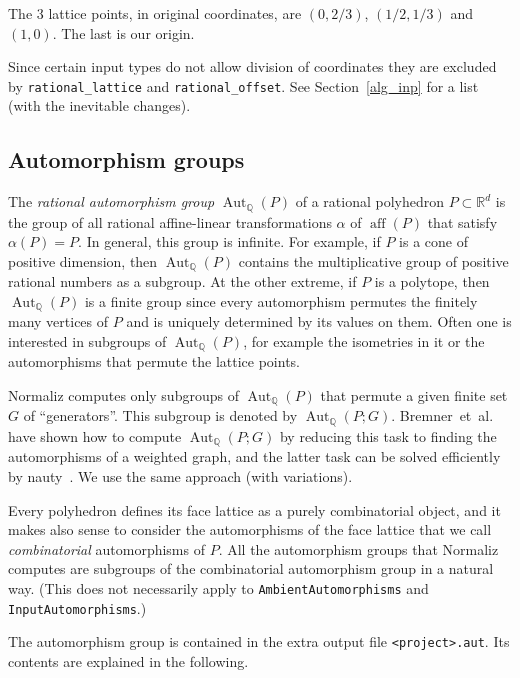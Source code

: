 \documentclass[12pt,a4paper]{scrartcl}
\theoremstyle{definition}
\def\QQ{{\mathbb Q}}
\def\RR{{\mathbb R}}
\DeclareMathOperator{\aff}{aff}
\begin{document}
The $3$ lattice points, in original coordinates, are $(0,2/3)$, $(1/2,1/3) $ and $(1,0)$. The last is our origin.

Since certain input types do not allow division of coordinates they are excluded by \verb|rational_lattice| and \verb|rational_offset|. See Section~\ref{alg_inp} for a list (with the inevitable changes).

\subsection{Automorphism groups}\label{Automorphisms}

\def\Aut{\operatorname{Aut}}

The \emph{rational automorphism group} $\Aut_\QQ(P)$ of a rational polyhedron $P\subset \RR^d$ is the group of all rational affine-linear transformations $\alpha$ of $\aff(P)$ that satisfy $\alpha(P)=P$. In general, this group is infinite. For example, if $P$ is a cone of positive dimension, then $\Aut_\QQ(P)$ contains the multiplicative group of positive rational numbers as a subgroup. At the other extreme, if $P$ is a polytope, then $\Aut_\QQ(P)$ is a finite group since every automorphism permutes the finitely many vertices of $P$ and is uniquely determined by its values on them. Often one is interested in subgroups of $\Aut_\QQ(P)$, for example the isometries in it or the automorphisms that permute the lattice points.

Normaliz computes only subgroups of $\Aut_\QQ(P)$ that permute a given finite set $G$ of ``generators''. This subgroup is denoted by $\Aut_\QQ(P;G)$. Bremner~et~al.~\cite{Bremner} have shown how to compute $\Aut_\QQ(P;G)$ by reducing this task to finding the automorphisms of a weighted graph, and the latter task can be solved efficiently by nauty~\cite{nauty}. We use the same approach (with variations).

Every polyhedron defines its face lattice as a purely combinatorial object, and it makes also sense to consider the automorphisms of the face lattice that we call \emph{combinatorial} automorphisms of $P$. All the automorphism groups that Normaliz computes are subgroups of the combinatorial automorphism group in a natural way. (This does not necessarily apply to \verb|AmbientAutomorphisms| and \verb|InputAutomorphisms|.)

The automorphism group is contained in the extra output file \verb|<project>.aut|. Its contents are explained in the following.
\end{document}
